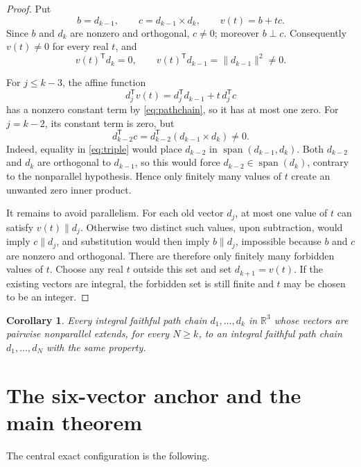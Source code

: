 \documentclass[11pt]{article}
\newtheorem{corollary}[theorem]{Corollary}
\theoremstyle{remark}
\newcommand{\R}{\mathbb{R}}
\newcommand{\Span}{\operatorname{span}}
\begin{document}
\begin{proof}
Put
\[
 b=d_{k-1},\qquad c=d_{k-1}\times d_k,
 \qquad v(t)=b+tc.
\]
Since $b$ and $d_k$ are nonzero and orthogonal, $c\ne0$; moreover $b\perp c$.
Consequently $v(t)\ne0$ for every real $t$, and
\[
 v(t)^{\mathsf T}d_k=0,
 \qquad
 v(t)^{\mathsf T}d_{k-1}=\lVert d_{k-1}\rVert^2\ne0.
\tag{3.2}\label{eq:newlast}
\]

For $j\le k-3$, the affine function
\[
 d_j^{\mathsf T}v(t)=d_j^{\mathsf T}d_{k-1}
       +t\,d_j^{\mathsf T}c
\]
has a nonzero constant term by \eqref{eq:pathchain}, so it has at most one
zero.  For $j=k-2$, its constant term is zero, but
\[
 d_{k-2}^{\mathsf T}c
 =d_{k-2}^{\mathsf T}(d_{k-1}\times d_k)\ne0.
\tag{3.3}\label{eq:triple}
\]
Indeed, equality in \eqref{eq:triple} would place $d_{k-2}$ in
$\Span(d_{k-1},d_k)$.  Both $d_{k-2}$ and $d_k$ are orthogonal to
$d_{k-1}$, so this would force $d_{k-2}\in\Span(d_k)$, contrary to the
nonparallel hypothesis.  Hence only finitely many values of $t$ create an
unwanted zero inner product.

It remains to avoid parallelism.  For each old vector $d_j$, at most one
value of $t$ can satisfy $v(t)\parallel d_j$.  Otherwise two distinct such
values, upon subtraction, would imply $c\parallel d_j$, and substitution
would then imply $b\parallel d_j$, impossible because $b$ and $c$ are
nonzero and orthogonal.  There are therefore only finitely many forbidden
values of $t$.  Choose any real $t$ outside this set and set
$d_{k+1}=v(t)$.  If the existing vectors are integral, the forbidden set is
still finite and $t$ may be chosen to be an integer.
\end{proof}

\begin{corollary}\label{cor:extend}
Every integral faithful path chain $d_1,\ldots,d_k$ in $\R^3$ whose vectors
are pairwise nonparallel extends, for every $N\ge k$, to an integral
faithful path chain $d_1,\ldots,d_N$ with the same property.
\end{corollary}

\section{The six-vector anchor and the main theorem}

The central exact configuration is the following.
\end{document}
